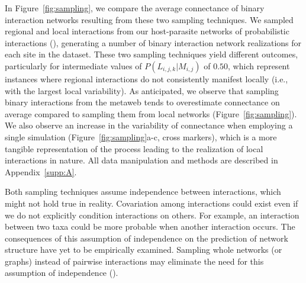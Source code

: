 \begin{box2.5}
In Figure~\ref{fig:sampling}, we compare the average connectance of binary
interaction networks resulting from these two sampling techniques. We sampled
regional and local interactions from our host-parasite networks of probabilistic
interactions (\cite{Kopelke2017Foodweb}), generating a number of binary
interaction network realizations for each site in the dataset. These two
sampling techniques yield different outcomes, particularly for intermediate
values of $P(L_{i, j, k}|M_{i, j})$ of $0.50$, which represent instances where
regional interactions do not consistently manifest locally (i.e., with the
largest local variability). As anticipated, we observe that sampling binary
interactions from the metaweb tends to overestimate connectance on average
compared to sampling them from local networks (Figure~\ref{fig:sampling}). We also
observe an increase in the variability of connectance when employing a single
simulation (Figure~\ref{fig:sampling}a-c, cross markers), which is a more tangible
representation of the process leading to the realization of local interactions
in nature. All data manipulation and methods are described in
Appendix~\ref{supp:A}.

Both sampling techniques assume independence between interactions, which might
not hold true in reality. Covariation among interactions could exist even if we
do not explicitly condition interactions on others. For example, an interaction
between two taxa could be more probable when another interaction occurs. The
consequences of this assumption of independence on the prediction of network
structure have yet to be empirically examined. Sampling whole networks (or
graphs) instead of pairwise interactions may eliminate the need for this
assumption of independence (\cite{Battiston2020Networks}).

\clearpage


\end{box2.5}
